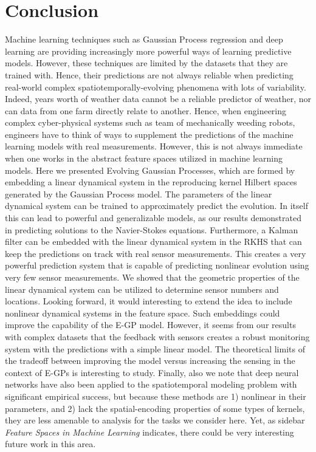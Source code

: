 \section{Conclusion}\label{sec:conclusion}
Machine learning techniques such as Gaussian Process regression and deep learning are providing increasingly more powerful ways of learning predictive models. However, these techniques are limited by the datasets that they are trained with. Hence, their predictions are not always reliable when predicting real-world complex spatiotemporally-evolving phenomena with lots of variability. Indeed, years worth of weather data cannot be a reliable predictor of weather, nor can data from one farm directly relate to another. Hence, when engineering complex cyber-physical systems such as team of mechanically weeding robots, engineers have to think of ways to supplement the predictions of the machine learning models with real measurements. However, this is not always immediate when one works in the abstract feature spaces utilized in machine learning models. Here we presented Evolving Gaussian Processes, which are formed by embedding a linear dynamical system in the %
reproducing kernel Hilbert spaces generated by the Gaussian Process model. The parameters of the linear dynamical system can be trained to approximately predict the evolution. In itself this can lead to powerful and generalizable models, as our results demonstrated in predicting solutions to the Navier-Stokes equations. Furthermore, a Kalman filter can be embedded with the linear dynamical system in the RKHS that can keep the predictions on track with real sensor measurements. This creates a very powerful prediction system that is capable of predicting nonlinear evolution using very few sensor measurements. We showed that the geometric properties of the linear dynamical system can be utilized to determine sensor numbers and locations. Looking forward, it would interesting to extend the idea to include nonlinear dynamical systems in the feature space. Such embeddings could improve the capability of the E-GP model. However, it seems from our results with complex datasets that the feedback with sensors creates a robust monitoring system with the predictions with a simple linear model. The theoretical limits of the tradeoff between improving the model versus increasing the sensing in the context of E-GPs is interesting to study. Finally, also we note that deep neural networks have also been applied to the spatiotemporal modeling problem with significant empirical success\cite{tran2015learning}, but because these methods are 1) nonlinear in their parameters, and 2) lack the spatial-encoding properties of some types of kernels, they are less amenable to analysis for the tasks we consider here. Yet, as sidebar \emph{Feature Spaces in Machine Learning} indicates, there could be very interesting future work in this area. %



